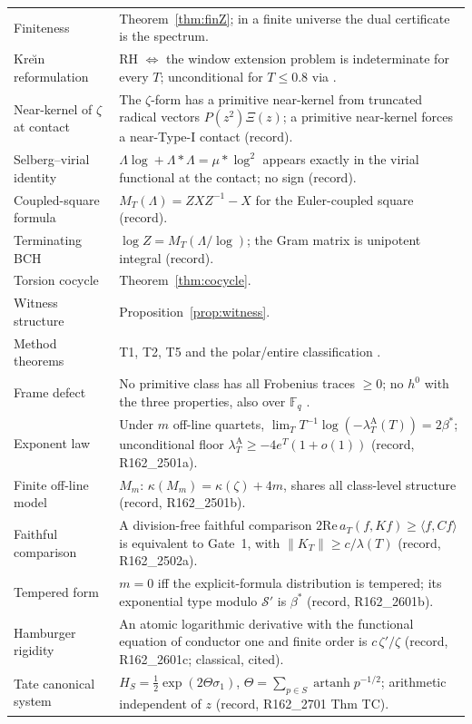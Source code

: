 \documentclass[11pt]{amsart}
\theoremstyle{definition}
\theoremstyle{remark}
\newcommand{\lamA}{\lambda^{\mathrm A}_T}
\begin{document}
\begin{longtable}{@{}p{4.2cm}p{10.3cm}@{}}
Finiteness & Theorem~\ref{thm:finZ}; in a finite universe the dual certificate is the spectrum. \\
Kre\u{\i}n reformulation & RH $\iff$ the window extension problem is indeterminate for every $T$; unconditional for $T\le0.8$ via \cite{Zhu2026} \cite[Thm.~8.5]{Paper47}. \\
Near-kernel of $\zeta$ at contact & The $\zeta$-form has a primitive near-kernel from truncated radical vectors $P(z^2)\Xi(z)$; a primitive near-kernel forces a near-Type-I contact (record). \\
Selberg--virial identity & $\Lambda\log+\Lambda*\Lambda=\mu*\log^2$ appears exactly in the virial functional at the contact; no sign (record). \\
Coupled-square formula & $M_T(\Lambda)=ZXZ^{-1}-X$ for the Euler-coupled square (record). \\
Terminating BCH & $\log Z=M_T(\Lambda/\log)$; the Gram matrix is unipotent integral (record). \\
Torsion cocycle & Theorem~\ref{thm:cocycle}. \\
Witness structure & Proposition~\ref{prop:witness}. \\
Method theorems & T1, T2, T5 and the polar/entire classification \cite[\S\S18, 27]{Paper46}. \\
Frame defect & No primitive class has all Frobenius traces $\ge0$; no $h^0$ with the three properties, also over $\mathbb F_q$ \cite{Paper46}. \\
Exponent law & Under $m$ off-line quartets, $\lim_TT^{-1}\log(-\lamA(T))=2\beta^*$; unconditional floor $\lamA\ge-4e^T(1+o(1))$ (record, R162\_2501a). \\
Finite off-line model & $M_m$: $\kappa(M_m)=\kappa(\zeta)+4m$, shares all class-level structure (record, R162\_2501b). \\
Faithful comparison & A division-free faithful comparison $2\mathrm{Re}\,a_T(f,Kf)\ge\langle f,Cf\rangle$ is equivalent to Gate~1, with $\|K_T\|\ge c/\lambda(T)$ (record, R162\_2502a). \\
Tempered form & $m=0$ iff the explicit-formula distribution is tempered; its exponential type modulo $\mathcal S'$ is $\beta^*$ (record, R162\_2601b). \\
Hamburger rigidity & An atomic logarithmic derivative with the functional equation of conductor one and finite order is $c\,\zeta'/\zeta$ (record, R162\_2601c; classical, cited). \\
Tate canonical system & $H_S=\frac12\exp(2\Theta\sigma_1)$, $\Theta=\sum_{p\in S}\operatorname{artanh}p^{-1/2}$; arithmetic independent of $z$ (record, R162\_2701 Thm TC). \\

\end{longtable}
\end{document}
